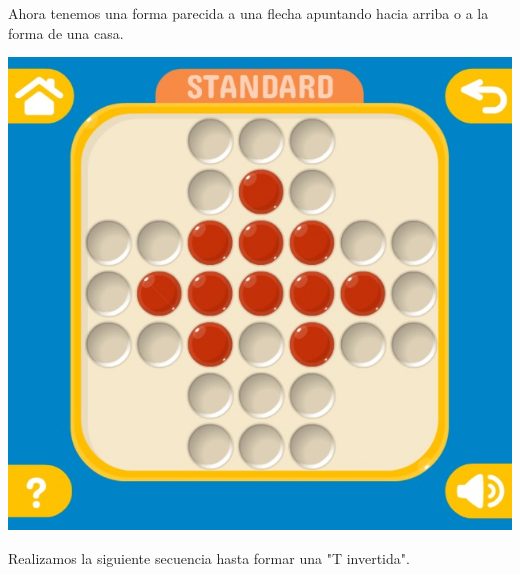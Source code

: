 \documentclass[10pt,a4paper]{report}
\begin{document}
Ahora tenemos una forma parecida a una flecha apuntando hacia arriba o a la forma de una casa.
\begin{center}
	\includegraphics[scale=.3]{14.jpg} \hspace{6cm}
\end{center}

Realizamos la siguiente secuencia hasta formar una "T invertida".
\end{document}
